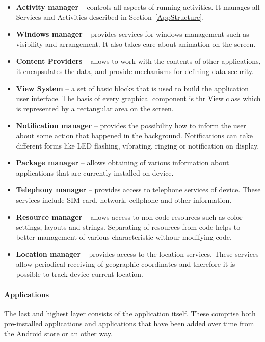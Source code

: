 \begin{itemize}
\item \textbf{Activity manager} -- controls all aspects of running activities. It manages all Services and Activities  described in Section~\ref{AppStructure}.
\item \textbf{Windows manager} -- provides services for windows management such as visibility and arrangement. It also takes care about animation on the screen.
\item \textbf{Content Providers} -- allows to work with the contents of other applications, it encapsulates the data, and provide mechanisms for defining data security.
\item \textbf{View System} -- a set of basic blocks that is used to build the application user interface. The basis of every graphical component is thr View class which is represented by a rectangular area on the screen.
\item \textbf{Notification manager} -- provides the possibility how to inform the user about some action that happened in the background. Notifications can take different forms like LED flashing, vibrating, ringing or notification on display.
\item \textbf{Package manager} -- allows obtaining of various information about applications that are currently installed on device.
\item \textbf{Telephony manager} -- provides access to telephone services of device. These services include SIM card, network, cellphone and other information.
\item \textbf{Resource manager} -- allows access to non-code resources such as color settings, layouts and strings. Separating of resources from code helps to better management of various characteristic withour modifying code.
\item \textbf{Location manager} -- provides access to the location services. These services allow periodical receiving of geographic coordinates and therefore it is possible to track device current location.
\end{itemize}

\paragraph{Applications}
The last and highest layer consists of the application itself. These comprise both pre-installed applications and applications that have been added over time from the Android store or an other way.

